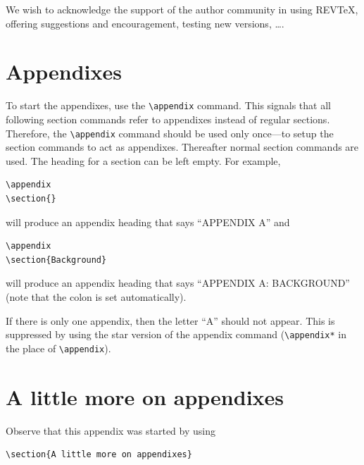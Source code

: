 \documentclass[%
reprint,
amsmath, amssymb,
aps,
floatfix,
]{revtex4-2}
\begin{document}
\begin{acknowledgments}
We wish to acknowledge the support of the author community in using
REV\TeX{}, offering suggestions and encouragement, testing new versions,
\dots.
\end{acknowledgments}

\appendix
\section{Appendixes}

To start the appendixes, use the \verb+\appendix+ command.
This signals that all following section commands refer to appendixes
instead of regular sections. Therefore, the \verb+\appendix+ command
should be used only once---to setup the section commands to act as
appendixes. Thereafter normal section commands are used. The heading
for a section can be left empty. For example,
\begin{verbatim}
\appendix
\section{}
\end{verbatim}
will produce an appendix heading that says ``APPENDIX A'' and
\begin{verbatim}
\appendix
\section{Background}
\end{verbatim}
will produce an appendix heading that says ``APPENDIX A: BACKGROUND''
(note that the colon is set automatically).

If there is only one appendix, then the letter ``A'' should not
appear. This is suppressed by using the star version of the appendix
command (\verb+\appendix*+ in the place of \verb+\appendix+).

\section{A little more on appendixes}

Observe that this appendix was started by using
\begin{verbatim}
\section{A little more on appendixes}
\end{verbatim}
\end{document}
